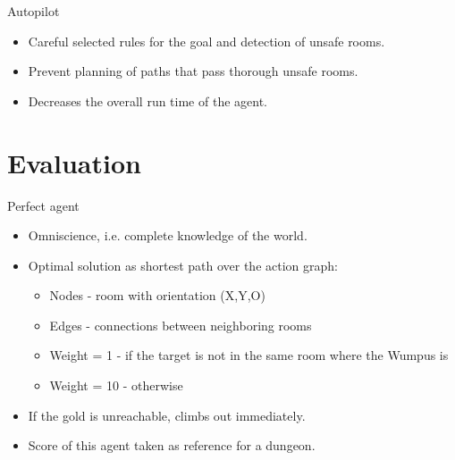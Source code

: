 \documentclass[smaller,dvipsnames,ratio=169]{beamer}
\begin{document}
  \begin{frame}{Autopilot}
  	\begin{itemize}
  		\item Careful selected rules for the goal and detection of unsafe rooms.
  		\item Prevent planning of paths that pass thorough unsafe rooms.		  		
		\item Decreases the overall run time of the agent.

  	\end{itemize}
  	
  \end{frame}


  \section{Evaluation}
  
  \begin{frame}{Perfect agent}
    
    \begin{itemize}
      \item Omniscience, i.e. complete knowledge of the world. 
      \item Optimal solution as shortest path over the action graph:
      \begin{itemize}
      	\item Nodes - room with orientation (X,Y,O)
      	\item Edges - connections between neighboring rooms
      	\item Weight = 1 - if the target is not in the same room where the Wumpus is 
      	\item Weight = 10 - otherwise
      \end{itemize}
	  \item If the gold is unreachable, climbs out immediately.
      \item Score of this agent taken as reference for a dungeon.
    \end{itemize}
  \end{frame}
\end{document}
